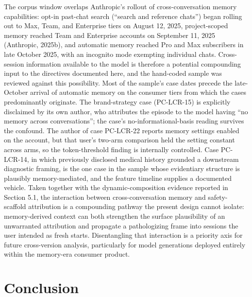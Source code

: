 \documentclass[11pt]{article}
\begin{document}
The corpus window overlaps Anthropic's rollout of cross-conversation memory capabilities: opt-in past-chat search (``search and reference chats'') began rolling out to Max, Team, and Enterprise tiers on August 12, 2025, project-scoped memory reached Team and Enterprise accounts on September 11, 2025 (Anthropic, 2025b), and automatic memory reached Pro and Max subscribers in late October 2025, with an incognito mode exempting individual chats. Cross-session information available to the model is therefore a potential compounding input to the directives documented here, and the hand-coded sample was reviewed against this possibility. Most of the sample's case dates precede the late-October arrival of automatic memory on the consumer tiers from which the cases predominantly originate. The brand-strategy case (PC-LCR-15) is explicitly disclaimed by its own author, who attributes the episode to the model having ``no memory across conversations''; the case's no-informational-basis reading survives the confound. The author of case PC-LCR-22 reports memory settings enabled on the account, but that user's two-arm comparison held the setting constant across arms, so the token-threshold finding is internally controlled. Case PC-LCR-14, in which previously disclosed medical history grounded a downstream diagnostic framing, is the one case in the sample whose evidentiary structure is plausibly memory-mediated, and the feature timeline supplies a documented vehicle. Taken together with the dynamic-composition evidence reported in Section 5.1, the interaction between cross-conversation memory and safety-scaffold attribution is a compounding pathway the present design cannot isolate: memory-derived context can both strengthen the surface plausibility of an unwarranted attribution and propagate a pathologizing frame into sessions the user intended as fresh starts. Disentangling that interaction is a priority axis for future cross-version analysis, particularly for model generations deployed entirely within the memory-era consumer product.

\FloatBarrier

\section{Conclusion}
\end{document}
